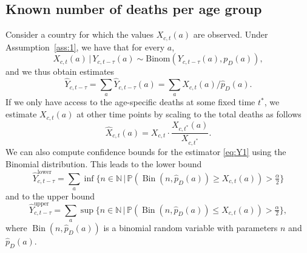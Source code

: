 \documentclass[a4paper]{article}
\newcommand\N{\mathbb{N}}
\renewcommand\P{\mathbb{P}}
\newcommand{\given}{\, \vert \,}
\newcommand\Rune[1]{{\color{blue}Rune: #1}}
\begin{document}
\subsection{Known number of deaths per age group} \label{sec:known}
%
Consider a country for which the values $X_{c,t}(a)$ are observed. 
Under Assumption~\ref{ass:1}, we have that for every $a$, 
$$X_{c,t}(a) \given Y_{c,t-\tau}(a) \sim \text{Binom}(Y_{c,t-\tau}(a), p_D(a)),$$
and we thus obtain estimates
\begin{equation}
  \label{eq:Y1}
  \hat{Y}_{c,t-\tau} = \sum_a \hat{Y}_{c,t-\tau}(a) =\sum_a
  X_{c,t}(a) / \hat  p_D(a).
\end{equation}
If we only have access to the age-specific deaths at some fixed time
$t^*$, we estimate $X_{c,t}(a)$ at other time points by scaling to the total deaths as follows
\begin{equation*}
  \hat{X}_{c,t}(a)=X_{c,t}\cdot\frac{X_{c,t^*}(a)}{X_{c,t^*}}.
\end{equation*}
We can also compute confidence bounds for the estimator \eqref{eq:Y1}
using the Binomial distribution. This leads to the lower bound
\begin{equation*}
  \hat{Y}_{c,t-\tau}^{\text{lower}} = \sum_a \inf\{n\in\N \,\vert\,
  \P(\operatorname{Bin}(n, \hat{p}_D(a))\geq
  X_{c,t}(a))>\tfrac{\alpha}{2}\}
\end{equation*}
and to the upper bound
\begin{equation*}
  \hat{Y}_{c,t-\tau}^{\text{upper}} = \sum_a \sup\{n\in\N \,\vert\, \P(\operatorname{Bin}(n, \hat{p}_D(a))\leq
  X_{c,t}(a))>\tfrac{\alpha}{2}\},
\end{equation*}
where $\operatorname{Bin}(n, \hat{p}_D(a))$ is a binomial random
variable with parameters $n$ and $\hat{p}_D(a)$.

\end{document}
